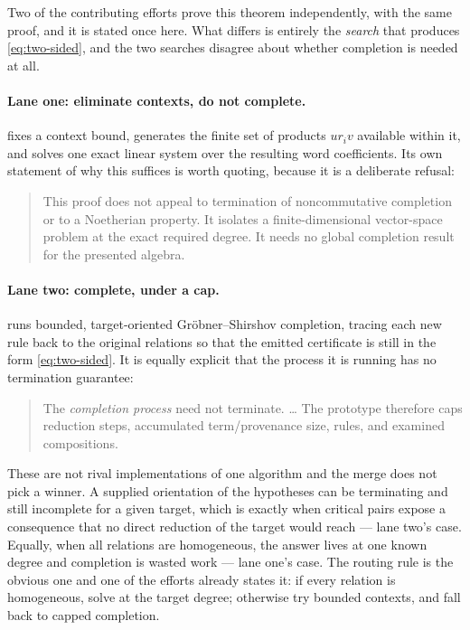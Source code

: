 Two of the contributing efforts prove this theorem independently, with the same
proof, and it is stated once here. What differs is entirely the \emph{search}
that produces \eqref{eq:two-sided}, and the two searches disagree about whether
completion is needed at all.

\paragraph{Lane one: eliminate contexts, do not complete.}  fixes a
context bound, generates the finite set of products $u r_i v$ available within
it, and solves one exact linear system over the resulting word coefficients.
Its own statement of why this suffices is worth quoting, because it is a
deliberate refusal:

\begin{quote}\small
This proof does not appeal to termination of noncommutative completion or to a
Noetherian property. It isolates a finite-dimensional vector-space problem at
the exact required degree. It needs no global completion result for the
presented algebra.
\end{quote}

\paragraph{Lane two: complete, under a cap.}  runs bounded,
target-oriented Gr\"obner--Shirshov completion, tracing each new rule back to
the original relations so that the emitted certificate is still in the form
\eqref{eq:two-sided}. It is equally explicit that the process it is running has
no termination guarantee:

\begin{quote}\small
The \emph{completion process} need not terminate. \ldots{} The prototype
therefore caps reduction steps, accumulated term/provenance size, rules, and
examined compositions.
\end{quote}

These are not rival implementations of one algorithm and the merge does not
pick a winner. A supplied orientation of the hypotheses can be terminating and
still incomplete for a given target, which is exactly when critical pairs expose
a consequence that no direct reduction of the target would reach --- lane two's
case. Equally, when all relations are homogeneous, the answer lives at one known
degree and completion is wasted work --- lane one's case. The routing rule is
the obvious one and one of the efforts already states it: if every relation is
homogeneous, solve at the target degree; otherwise try bounded contexts, and
fall back to capped completion.


